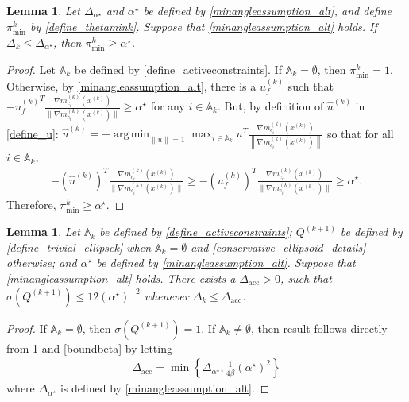 \documentclass{article}
\newtheorem{lemma}[theorem]{Lemma}
\theoremstyle{case}
\numberwithin{theorem}{subsection}
\DeclareMathOperator*{\argmin}{arg\,min}
\newcommand{\activeconstraintsk}{{\mathbb A_{k}}}
\newcommand{\ck}{{c^{(k)}}}
\newcommand{\dacc}{{\Delta_{\textrm{acc}}}}
\newcommand{\dk}{\Delta_k}
\newcommand{\gmcik}{{\nabla m_{c_i}^{(k)}\left(\xk\right)}}
\newcommand{\huk}{{{\hat u}^{(k)}}}
\newcommand{\minanglealpha}{{ \alpha^{\star} }}
\newcommand{\minangledelta}{{\Delta_{\alpha^{\star}}}}
\newcommand{\qk}{{Q^{(k)}}}
\newcommand{\sk}{{{s}^{(k)}}}
\newcommand{\thetamink}{{\pi^k_{\textrm{min}}}}
\newcommand{\xk}{x^{(k)}}
\newcommand{\qkpo}{{Q^{(k+1)}}}
\newcommand{\minangledirk}{{u^{(k)}_f}}
\begin{document}
\begin{lemma}
\label{theta_min_is_bounded}
Let $\minangledelta$ and $\minanglealpha$ be defined by \cref{minangleassumption_alt}, and
define $\thetamink$ by \cref{define_thetamink}.
Suppose that \cref{minangleassumption_alt} holds.
If $\dk \le \minangledelta$, then $\thetamink \ge \minanglealpha$.
\end{lemma}

\begin{proof}
Let $\activeconstraintsk$ be defined by \cref{define_activeconstraints}.
If $\activeconstraintsk = \emptyset$, then $\thetamink = 1$.
Otherwise, by \cref{minangleassumption_alt}, there is a $\minangledirk$ such that 
$-\minangledirk^T\frac{\gmcik}{\|\gmcik\|} \ge \minanglealpha$ for any $i \in \activeconstraintsk$.
But, by definition of $\huk$ in \cref{define_u}:
$\huk = -\argmin_{\|u\| = 1} \max_{i \in \activeconstraintsk} u^T\frac{\gmcik}{\left\|\gmcik\right\|}$
so that for all $i \in \activeconstraintsk$,
\begin{align*}
-\left(\huk\right)^T\frac{\gmcik}{\|\gmcik\|}  \ge -\left(\minangledirk\right)^T\frac{\gmcik}{\|\gmcik\|} \ge \minanglealpha.
\end{align*}
Therefore, $\thetamink \ge \minanglealpha$.
\end{proof}

\begin{lemma}
\label{bounded_condition_numbers}
Let $\activeconstraintsk$ be defined by \cref{define_activeconstraints};
$\qkpo$ be defined by \cref{define_trivial_ellipsek} when $\activeconstraintsk = \emptyset$ and \cref{conservative_ellipsoid_details} otherwise;
and $\minanglealpha$ be defined by \cref{minangleassumption_alt}.
Suppose that \cref{minangleassumption_alt} holds.
There exists a $\dacc > 0$, such that $\sigma(\qkpo) \le {12}\left(\minanglealpha\right)^{-2}$ whenever $\dk \le \dacc$.
\end{lemma}
\begin{proof}
If $\activeconstraintsk = \emptyset$, then 
$\sigma\left(\qkpo\right) = 1$.
If $\activeconstraintsk \ne \emptyset$, then result follows directly from \cref{theta_min_is_bounded} and \cref{boundbeta} by letting
\begin{align}
\dacc = \min\left\{\minangledelta, \frac 1 {4 \beta} \left(\minanglealpha \right)^2 \right\} \label{define_delta_accuracy}
\end{align}
where $\minangledelta$ is defined by \cref{minangleassumption_alt}.
\end{proof}
\end{document}
